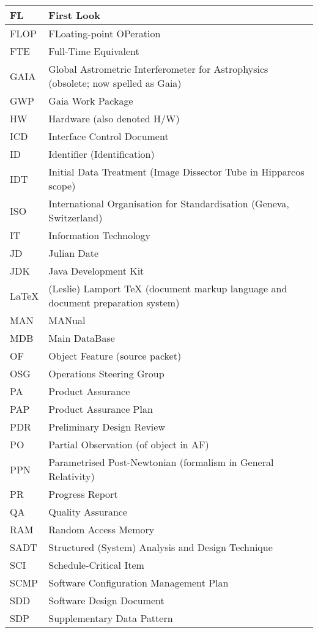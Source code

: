 \begin{longtable}{|l|p{}|}
FL&First Look \\\hline
FLOP&FLoating-point OPeration \\\hline
FTE&Full-Time Equivalent \\\hline
GAIA&Global Astrometric Interferometer for Astrophysics (obsolete; now spelled as Gaia) \\\hline
GWP&Gaia Work Package \\\hline
HW&Hardware (also denoted H/W) \\\hline
ICD&Interface Control Document \\\hline
ID&Identifier (Identification) \\\hline
IDT&Initial Data Treatment (Image Dissector Tube in Hipparcos scope) \\\hline
ISO&International Organisation for Standardisation (Geneva, Switzerland) \\\hline
IT&Information Technology \\\hline
JD&Julian Date \\\hline
JDK&Java Development Kit \\\hline
LaTeX&(Leslie) Lamport TeX (document markup language and document preparation system) \\\hline
MAN&MANual \\\hline
MDB&Main DataBase \\\hline
OF&Object Feature (source packet) \\\hline
OSG&Operations Steering Group \\\hline
PA&Product Assurance \\\hline
PAP&Product Assurance Plan \\\hline
PDR&Preliminary Design Review \\\hline
PO&Partial Observation (of object in AF) \\\hline
PPN&Parametrised Post-Newtonian (formalism in General Relativity) \\\hline
PR&Progress Report \\\hline
QA&Quality Assurance \\\hline
RAM&Random Access Memory \\\hline
SADT&Structured (System) Analysis and Design Technique \\\hline
SCI&Schedule-Critical Item \\\hline
SCMP&Software Configuration Management Plan \\\hline
SDD&Software Design Document \\\hline
SDP&Supplementary Data Pattern \\\hline

\end{longtable}
